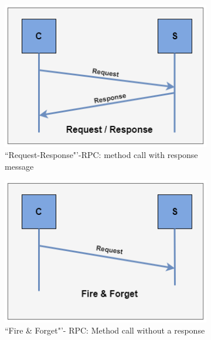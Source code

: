 \begin{figure}[!htb]
		\begin{subfigure}[b]{.5\textwidth}
				\includegraphics[width=\textwidth]{images/Request-response.png}
				\caption{``Request-Response"'-RPC: method call with response message}
				\label{fig:Request-response}
		\end{subfigure}		
		\begin{subfigure}[b]{.5\textwidth}
			\includegraphics[width=\textwidth]{images/fire-forget.png}
			\caption{``Fire \& Forget"'- RPC: Method call without a response}
			\label{fig:fire-forget}
		\end{subfigure}
		\begin{subfigure}[b]{.5\textwidth}

\end{subfigure}
\end{figure}
